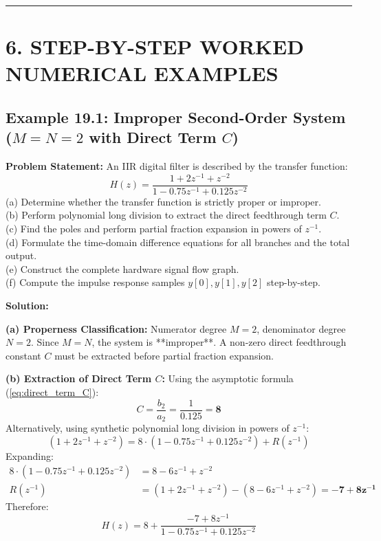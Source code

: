 \documentclass[11pt,a4paper]{article}
\begin{document}
\noindent\rule{\textwidth}{0.5pt}

\section{6. STEP-BY-STEP WORKED NUMERICAL EXAMPLES}

\subsection{\texorpdfstring{Example 19.1: Improper Second-Order System ($M = N = 2$ with Direct Term $C$)}{Example 19.1: Improper Second-Order System (M = N = 2 with Direct Term C)}}
\textbf{Problem Statement:} An IIR digital filter is described by the transfer function:
\begin{equation}
H(z) = \frac{1 + 2 z^{-1} + z^{-2}}{1 - 0.75 z^{-1} + 0.125 z^{-2}}
\end{equation}
(a) Determine whether the transfer function is strictly proper or improper. \\
(b) Perform polynomial long division to extract the direct feedthrough term $C$. \\
(c) Find the poles and perform partial fraction expansion in powers of $z^{-1}$. \\
(d) Formulate the time-domain difference equations for all branches and the total output. \\
(e) Construct the complete hardware signal flow graph. \\
(f) Compute the impulse response samples $y[0], y[1], y[2]$ step-by-step.

\vspace{0.3cm}
\noindent\textbf{Solution:}

\noindent\textbf{(a) Properness Classification:}
Numerator degree $M = 2$, denominator degree $N = 2$.
Since $M = N$, the system is **improper**. A non-zero direct feedthrough constant $C$ must be extracted before partial fraction expansion.

\vspace{0.2cm}
\noindent\textbf{(b) Extraction of Direct Term $C$:}
Using the asymptotic formula (\ref{eq:direct_term_C}):
\begin{equation}
C = \frac{b_2}{a_2} = \frac{1}{0.125} = \mathbf{8}
\end{equation}
Alternatively, using synthetic polynomial long division in powers of $z^{-1}$:
\begin{equation}
(1 + 2 z^{-1} + z^{-2}) = 8 \cdot (1 - 0.75 z^{-1} + 0.125 z^{-2}) + R(z^{-1})
\end{equation}
Expanding:
\begin{align}
8 \cdot (1 - 0.75 z^{-1} + 0.125 z^{-2}) &= 8 - 6 z^{-1} + z^{-2} \\
R(z^{-1}) &= (1 + 2 z^{-1} + z^{-2}) - (8 - 6 z^{-1} + z^{-2}) = \mathbf{-7 + 8 z^{-1}}
\end{align}
Therefore:
\begin{equation}
H(z) = 8 + \frac{-7 + 8 z^{-1}}{1 - 0.75 z^{-1} + 0.125 z^{-2}}
\end{equation}
\end{document}
